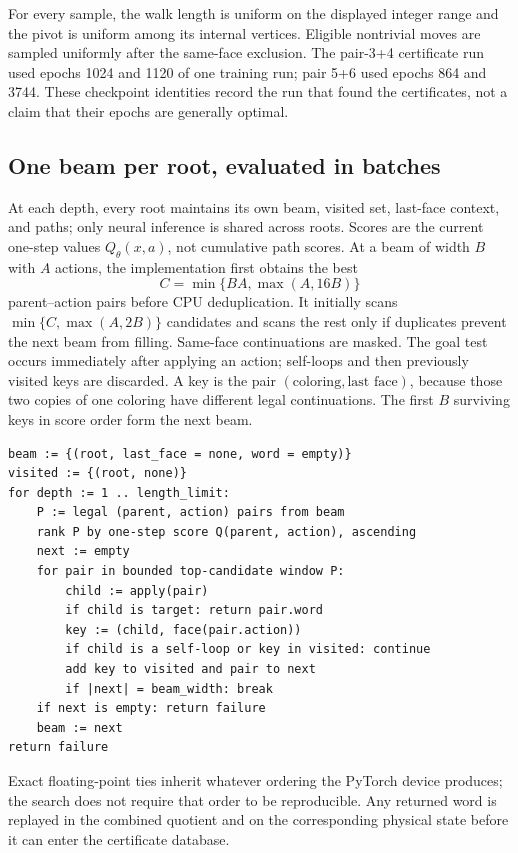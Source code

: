 For every sample, the walk length is uniform on the displayed integer range
and the pivot is uniform among its internal vertices.  Eligible nontrivial
moves are sampled uniformly after the same-face exclusion.  The pair-3+4
certificate run used epochs 1024 and 1120 of one training run; pair 5+6 used
epochs 864 and 3744.  These checkpoint identities record the run that found
the certificates, not a claim that their epochs are generally optimal.

\subsection{One beam per root, evaluated in batches}
\label{sec:batched-beam}

At each depth, every root maintains its own beam, visited set, last-face
context, and paths; only neural inference is shared across roots.  Scores are
the current one-step values $Q_\theta(x,a)$, not cumulative path scores.  At a
beam of width $B$ with $A$ actions, the implementation first obtains the best
\[
  C=\min\{BA,\max(A,16B)\}
\]
parent--action pairs before CPU deduplication.  It initially scans
\(\min\{C,\max(A,2B)\}\) candidates and scans the rest only if duplicates
prevent the next beam from filling.  Same-face continuations are masked.  The
goal test occurs immediately after applying an action; self-loops and then
previously visited keys are discarded.  A key is the pair
\((\text{coloring},\text{last face})\), because those two copies of one
coloring have different legal continuations.  The first $B$ surviving keys in
score order form the next beam.

\begin{lstlisting}[caption={One root of the batched beam search.  Model calls
for all active roots are fused in the implementation.},label={lst:inner-beam}]
beam := {(root, last_face = none, word = empty)}
visited := {(root, none)}
for depth := 1 .. length_limit:
    P := legal (parent, action) pairs from beam
    rank P by one-step score Q(parent, action), ascending
    next := empty
    for pair in bounded top-candidate window P:
        child := apply(pair)
        if child is target: return pair.word
        key := (child, face(pair.action))
        if child is a self-loop or key in visited: continue
        add key to visited and pair to next
        if |next| = beam_width: break
    if next is empty: return failure
    beam := next
return failure
\end{lstlisting}

Exact floating-point ties inherit whatever ordering the PyTorch device
produces; the search does not require that order to be reproducible.  Any returned word is replayed
in the combined quotient and on the corresponding physical state before it can
enter the certificate database.

